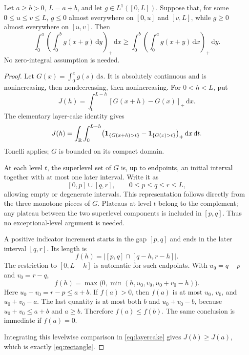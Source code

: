 \documentclass[11pt,a4paper]{article}
\theoremstyle{remark}\newtheorem*{ednote}{Editorial note (ProveIt, 2026-10-01)}
\newcommand{\ind}{\mathbf1}\newcommand{\dd}{\,\mathrm d}
\begin{document}
\begin{lemma}\label{lem:rectangle}
Let $a\ge b>0$, $L=a+b$, and let $g\in L^1([0,L])$. Suppose that, for some $0\le u\le v\le L$, $g\le0$ almost everywhere on $[0,u]$ and $[v,L]$, while $g\ge0$ almost everywhere on $[u,v]$. Then
\begin{equation}\label{eq:rectangle}
 \int_0^a\left(\int_0^b g(x+y)\dd y\right)_+\dd x
 \ge
 \int_0^b\left(\int_0^a g(x+y)\dd x\right)_+\dd y.
\end{equation}
No zero-integral assumption is needed.
\end{lemma}
\begin{proof}
Let $G(x)=\int_0^xg(s)\dd s$. It is absolutely continuous and is nonincreasing, then nondecreasing, then nonincreasing. For $0<h<L$, put
\[
 J(h)=\int_0^{L-h}[G(x+h)-G(x)]_+\dd x.
\]
The elementary layer-cake identity gives
\begin{equation}\label{eq:layercake}
 J(h)=\int_{\R}\int_0^{L-h}
 \bigl(\ind_{\{G(x+h)>t\}}-\ind_{\{G(x)>t\}}\bigr)_+
 \dd x\dd t.
\end{equation}
Tonelli applies; $G$ is bounded on its compact domain.

At each level $t$, the superlevel set of $G$ is, up to endpoints, an initial interval together with at most one later interval. Write it as
\[
 [0,p]\cup[q,r],\qquad 0\le p\le q\le r\le L,
\]
allowing empty or degenerate intervals. This representation follows directly from the three monotone pieces of $G$. Plateaus at level $t$ belong to the complement; any plateau between the two superlevel components is included in $[p,q]$. Thus no exceptional-level argument is needed.

A positive indicator increment starts in the gap $[p,q]$ and ends in the later interval $[q,r]$. Its length is
\[
 f(h)=|[p,q]\cap[q-h,r-h]|.
\]
The restriction to $[0,L-h]$ is automatic for such endpoints. With $u_0=q-p$ and $v_0=r-q$,
\begin{equation}\label{eq:trapezoid}
 f(h)=\max\bigl(0,\min(h,u_0,v_0,u_0+v_0-h)\bigr).
\end{equation}
Here $u_0+v_0=r-p\le a+b$. If $f(a)>0$, then $f(a)$ is at most $u_0$, $v_0$, and $u_0+v_0-a$. The last quantity is at most both $b$ and $u_0+v_0-b$, because $u_0+v_0\le a+b$ and $a\ge b$. Therefore $f(a)\le f(b)$. The same conclusion is immediate if $f(a)=0$.

Integrating this levelwise comparison in \eqref{eq:layercake} gives $J(b)\ge J(a)$, which is exactly \eqref{eq:rectangle}.
\end{proof}
\end{document}
